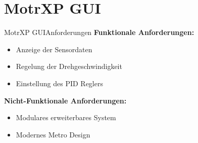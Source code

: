  \author{Ricardo Krause}
\section{MotrXP GUI}

		\begin{frame}{MotrXP GUI}{Anforderungen}
		\textbf{Funktionale Anforderungen:}
	  		\begin{itemize}
	   	 		\item Anzeige der Sensordaten
	    		\item Regelung der Drehgeschwindigkeit
	    		\item Einstellung des PID Reglers
	  		\end{itemize}
	  		\textbf{Nicht-Funktionale Anforderungen:}
	  		\begin{itemize}
	   	 		\item Modulares erweiterbares System 
	    		\item Modernes Metro Design
	  		\end{itemize}
		\end{frame}

